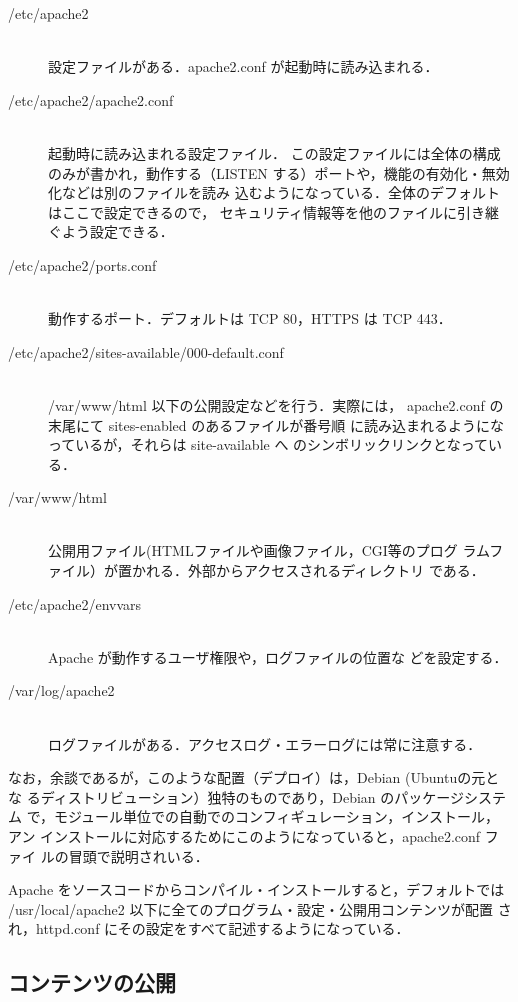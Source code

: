 \begin{description}
 \item[/etc/apache2] \ \\
            設定ファイルがある．apache2.conf が起動時に読み込まれる．
 \item[/etc/apache2/apache2.conf] \ \\ 起動時に読み込まれる設定ファイル．
	    この設定ファイルには全体の構成のみが書かれ，動作する（LISTEN
            する）ポートや，機能の有効化・無効化などは別のファイルを読み
            込むようになっている．全体のデフォルトはここで設定できるので，
	    セキュリティ情報等を他のファイルに引き継ぐよう設定できる．
 \item[/etc/apache2/ports.conf]  \ \\ 動作するポート．デフォルトは TCP
	    80，HTTPS は TCP 443．
 \item[/etc/apache2/sites-available/000-default.conf] \ \\
	    /var/www/html 以下の公開設定などを行う．実際には，
	    apache2.conf の末尾にて sites-enabled のあるファイルが番号順
	    に読み込まれるようになっているが，それらは site-available へ
	    のシンボリックリンクとなっている．
 \item[/var/www/html] \ \\
            公開用ファイル(HTMLファイルや画像ファイル，CGI等のプログ
	    ラムファイル）が置かれる．外部からアクセスされるディレクトリ
	    である．
 \item[/etc/apache2/envvars] \ \\ Apache が動作するユーザ権限や，ログファイルの位置な
	    どを設定する．
 \item[/var/log/apache2] \ \\
            ログファイルがある．アクセスログ・エラーログには常に注意する．
\end{description}

なお，余談であるが，このような配置（デプロイ）は，Debian (Ubuntuの元とな
るディストリビューション）独特のものであり，Debian のパッケージシステム
で，モジュール単位での自動でのコンフィギュレーション，インストール，アン
インストールに対応するためにこのようになっていると，apache2.conf ファイ
ルの冒頭で説明されいる．

Apache をソースコードからコンパイル・インストールすると，デフォルトでは
/usr/local/apache2 以下に全てのプログラム・設定・公開用コンテンツが配置
され，httpd.conf にその設定をすべて記述するようになっている．

\subsection{コンテンツの公開}

